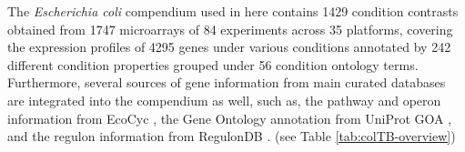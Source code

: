 The \textit{Escherichia coli} compendium used in here contains 1429 condition
contrasts obtained from 1747 microarrays of 84 experiments across 35 platforms,
covering the expression profiles of 4295 genes under various conditions
annotated by 242 different condition properties grouped under 56 condition
ontology terms.
%
Furthermore, several sources of gene information from main curated databases are
integrated into the compendium as well, such as, the pathway and operon
information from EcoCyc \cite{Keseler2009}, the Gene Ontology annotation from
UniProt GOA \cite{Camon2004}, and the regulon information from RegulonDB
\cite{Gama-Castro2008}. (see Table \ref{tab:colTB-overview})



